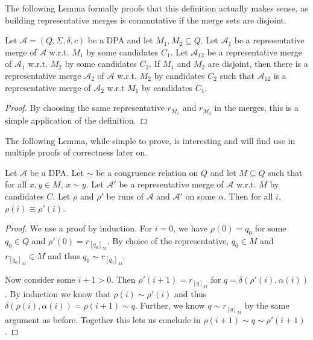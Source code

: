 \vspace{5pt}

The following Lemma formally proofs that this definition actually makes sense, as building representative merges is commutative if the merge sets are disjoint.

\begin{lem}
	Let $\mathcal{A} = (Q, \Sigma, \delta, c)$ be a DPA and let $M_1, M_2 \subseteq Q$. Let $\mathcal{A}_1$ be a representative merge of $\mathcal{A}$ w.r.t. $M_1$ by some candidates $C_1$. Let $\mathcal{A}_{12}$ be a representative merge of $\mathcal{A}_1$ w.r.t. $M_2$ by some candidates $C_2$. If $M_1$ and $M_2$ are disjoint, then there is a representative merge $\mathcal{A}_2$ of $\mathcal{A}$ w.r.t. $M_2$ by candidates $C_2$ such that $\mathcal{A}_{12}$ is a representative merge of $\mathcal{A}_2$ w.r.t $M_1$ by candidates $C_1$.
\end{lem}

\begin{proof}
	By choosing the same representative $r_{M_1}$ and $r_{M_2}$ in the merges, this is a simple application of the definition.
\end{proof}

The following Lemma, while simple to prove, is interesting and will find use in multiple proofs of correctness later on.

\begin{lem}
	Let $\mathcal{A}$ be a DPA. Let $\sim$ be a congruence relation on $Q$ and let $M \subseteq Q$ such that for all $x, y \in M$, $x \sim y$. Let $\mathcal{A}'$ be a representative merge of $\mathcal{A}$ w.r.t. $M$ by candidates $C$. Let $\rho$ and $\rho'$ be runs of $\mathcal{A}$ and $\mathcal{A}'$ on some $\alpha$. Then for all $i$, $\rho(i) \equiv \rho'(i)$.
	\label{lem:general:cong_stays_in_merge}
\end{lem}

\begin{proof}
	We use a proof by induction. For $i = 0$, we have $\rho(0) = q_0$ for some $q_0 \in Q$ and $\rho'(0) = r_{[q_0]_M}$. By choice of the representative, $q_0 \in M$ and $r_{[q_0]_M} \in M$ and thus $q_0 \sim r_{[q_0]_M}$.
	
	Now consider some $i+1 > 0$. Then $\rho'(i+1) = r_{[q]_M}$ for $q = \delta(\rho'(i), \alpha(i))$. By induction we know that $\rho(i) \sim \rho'(i)$ and thus $\delta(\rho(i), \alpha(i)) = \rho(i+1) \sim q$. Further, we know $q \sim r_{[q]_M}$ by the same argument as before. Together this lets us conclude in $\rho(i+1) \sim q \sim \rho'(i+1)$.
\end{proof}


